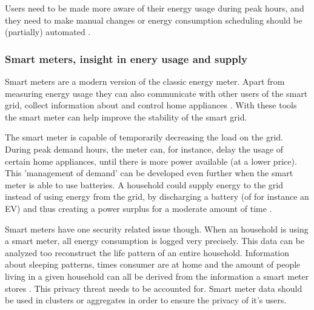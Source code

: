 Users need to be made more aware of their energy usage during peak hours, and they need to make manual changes \cite{Mohsenian-RadLeon-Garcia2010} or energy consumption scheduling should be (partially) automated  \cite{SamadiMohsenian-RadSchoberEtAl2012}.

\subsubsection{Smart meters, insight in enery usage and supply}

Smart meters are a modern version of the classic energy meter. Apart from measuring energy usage they can also communicate with other users of the smart grid, collect information about and control home appliances \cite{DepuruWangDevabhaktuni2011a}. With these tools the smart meter can help improve the stability of the smart grid.

The smart meter is capable of temporarily decreasing the load on the grid. During peak demand hours, the meter can, for instance, delay the usage of certain home appliances, until there is more power available (at a lower price). 
This 'management of demand' can be developed even further when the smart meter is able to use batteries. A household could supply energy to the grid instead of using energy from the grid, by discharging a battery (of for instance an EV) and thus creating a power surplus for a moderate amount of time \cite{MwasiluJustoKimEtAl2014}. 

Smart meters have one security related issue though. When an household is using a smart meter, all energy consumption is logged very precisely. This data can be analyzed too reconstruct the life pattern of an entire household. Information about sleeping patterns, times consumer are at home and the amount of people living in a given household can all be derived from the information a smart meter stores \cite{Molina-MarkhamShenoyFuEtAl2010}. This privacy threat needs to be accounted for. Smart meter data should be used in clusters or aggregates in order to ensure the privacy of it's users.
